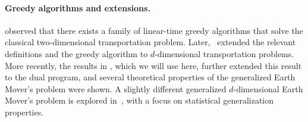 \paragraph{Greedy algorithms and extensions.}
\cite{hoffman1963simple} observed that there exists a family of linear-time greedy algorithms that solve the classical two-dimensional transportation problem. %
Later,~\cite{BEIN199597} extended
the relevant definitions and the greedy algorithm to $d$-dimensional transportation problems.
More recently, the results in \cite{kline2019properties}, 
which we will use here, further extended this result to the dual program,  
and several theoretical properties of the generalized Earth Mover's problem were shown. 
A slightly different generalized 
$d$-dimensional Earth Mover's problem is explored in~\cite{erickson2020generalization}, 
with a focus on statistical generalization properties.











